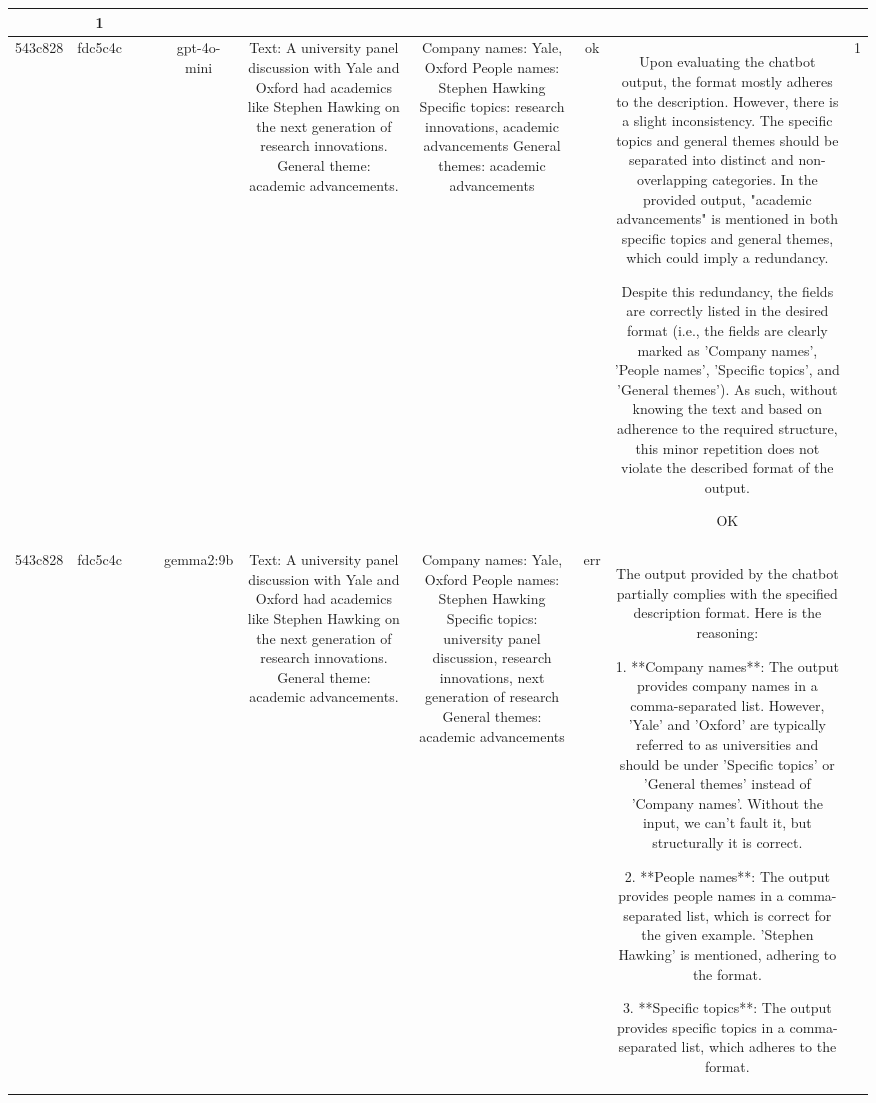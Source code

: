 \begin{table}[h!]
\begin{tabular}{|c|c|c|c|c|c|c|c|c|c|}
{ERR & 1\\
\hline
543c828 & fdc5c4c &  &  & gpt-4o-mini & Text: A university panel discussion with Yale and Oxford had academics like Stephen Hawking on the next generation of research innovations. General theme: academic advancements. & Company names: Yale, Oxford  
People names: Stephen Hawking  
Specific topics: research innovations, academic advancements  
General themes: academic advancements   & ok & Upon evaluating the chatbot output, the format mostly adheres to the description. However, there is a slight inconsistency. The specific topics and general themes should be separated into distinct and non-overlapping categories. In the provided output, "academic advancements" is mentioned in both specific topics and general themes, which could imply a redundancy. 

Despite this redundancy, the fields are correctly listed in the desired format (i.e., the fields are clearly marked as 'Company names', 'People names', 'Specific topics', and 'General themes'). As such, without knowing the text and based on adherence to the required structure, this minor repetition does not violate the described format of the output.

OK & 1\\
\hline
543c828 & fdc5c4c &  &  & gemma2:9b & Text: A university panel discussion with Yale and Oxford had academics like Stephen Hawking on the next generation of research innovations. General theme: academic advancements. & Company names: Yale, Oxford 
People names: Stephen Hawking 
Specific topics: university panel discussion, research innovations, next generation of research  
General themes: academic advancements 
 & err & The output provided by the chatbot partially complies with the specified description format. Here is the reasoning:

1. **Company names**: The output provides company names in a comma-separated list. However, 'Yale' and 'Oxford' are typically referred to as universities and should be under 'Specific topics' or 'General themes' instead of 'Company names'. Without the input, we can't fault it, but structurally it is correct.

2. **People names**: The output provides people names in a comma-separated list, which is correct for the given example. 'Stephen Hawking' is mentioned, adhering to the format.

3. **Specific topics**: The output provides specific topics in a comma-separated list, which adheres to the format.

}
\end{tabular}
\end{table}
